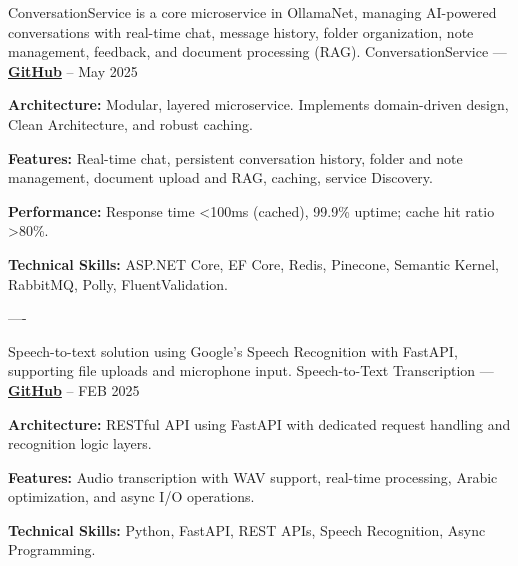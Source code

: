 \begin{cventries}
\cventry
    {ConversationService is a core microservice in OllamaNet, 
    managing AI-powered conversations with real-time chat, message history, folder organization, note management, 
    feedback, and document processing (RAG).}
    {ConversationService — \href{https://github.com/ollamaNet/OllamaNet-Architecture/tree/master/ConversationService}{\color{midnightblue}\textbf{GitHub}} \textrm{\faArrowRight}}
    {--}
    {May 2025}
    {
      \begin{cvitems}
        \item \textbf{Architecture:}{ Modular, layered microservice. Implements domain-driven design, Clean Architecture, and robust caching.}
        \item \textbf{Features:}{ Real-time chat, persistent conversation history, folder and note management, document upload and RAG, caching, service Discovery.}
        \item \textbf{Performance:}{ Response time <100ms (cached), 99.9\% uptime; cache hit ratio >80\%.}
        \item \textbf{Technical Skills:}{ ASP.NET Core, EF Core, Redis, Pinecone, Semantic Kernel, RabbitMQ, Polly, FluentValidation.}
      \end{cvitems}
    }
    \begin{singlespace}
----
\end{singlespace}


\cventry
    {Speech-to-text solution using Google's Speech Recognition with FastAPI, supporting file uploads and microphone input.} %
    {Speech-to-Text Transcription — \href{https://github.com/ibrhmahmd/audio-recognition}{\color{midnightblue}\textbf{GitHub}} \textrm{\faArrowRight}} %
    {--} %
    {FEB 2025} %
    {
      \begin{cvitems} %
        \item \textbf{Architecture:}{ RESTful API using FastAPI with dedicated request handling and recognition logic layers.}
        \item \textbf{Features:}{ Audio transcription with WAV support, real-time processing, Arabic optimization, and async I/O operations.}
        \item \textbf{Technical Skills:}{ Python, FastAPI, REST APIs, Speech Recognition, Async Programming.}
      \end{cvitems}
    }




\end{cventries}
